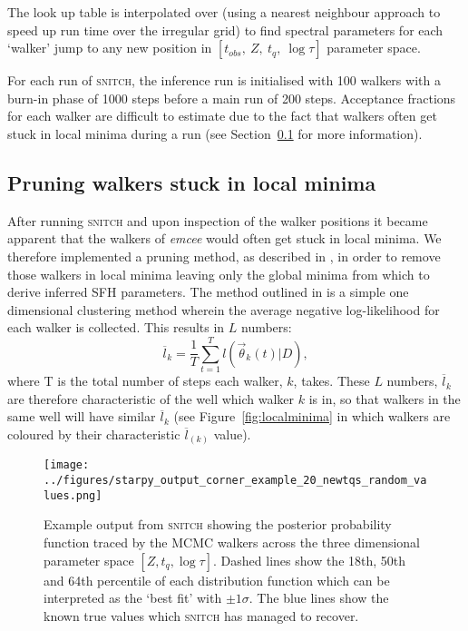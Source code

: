 \documentclass[useAMS,usenatbib]{mn2e}
\begin{document}
 
The look up table is interpolated over (using a nearest neighbour approach to speed up run time over the irregular grid) to find spectral parameters for each `walker' jump to any new position in $[t_{obs},~Z,~t_q,~\log\tau]$ parameter space. 

For each run of \textsc{snitch}, the inference run is initialised with 100 walkers with a burn-in phase of 1000 steps before a main run of 200 steps. Acceptance fractions for each walker are difficult to estimate due to the fact that walkers often get stuck in local minima during a run (see Section~\ref{sec:pruning} for more information). 



\subsection{Pruning walkers stuck in local minima}\label{sec:pruning}




After running \textsc{snitch} and upon inspection of the walker positions it became apparent that the walkers of \emph{emcee} would often get stuck in local minima. We therefore implemented a pruning method, as described in \cite{hou12}, in order to remove those walkers in local minima leaving only the global minima from which to derive inferred SFH parameters. The method outlined in \cite{hou12} is a simple one dimensional clustering method wherein the average negative log-likelihood for each walker is collected. This results in $L$ numbers:
\begin{equation}
\overline{l}_k = \frac{1}{T} \sum^{T}_{t=1} l(\vec{\theta}_k(t)|D),
\end{equation}
where T is the total number of steps each walker, $k$, takes. These $L$ numbers, $\overline{l}_k$ are therefore characteristic of the well which walker $k$ is in, so that walkers in the same well will have similar $\overline{l}_k$ (see Figure~\ref{fig:localminima} in which walkers are coloured by their characteristic $\overline{l}_{(k)}$ value). 

\begin{figure*}
\centering
\texttt{[image: ../figures/starpy\_output\_corner\_example\_20\_newtqs\_random\_values.png]}
\caption{Example output from \textsc{snitch} showing the posterior probability function traced by the MCMC walkers across the three dimensional parameter space $[Z, t_q, \log\tau]$. Dashed lines show the 18th, 50th and 64th percentile of each distribution function which can be interpreted as the `best fit' with $±1\sigma$. The blue lines show the known true values which \textsc{snitch} has managed to recover.}
\label{fig:output}
\end{figure*}
\end{document}
